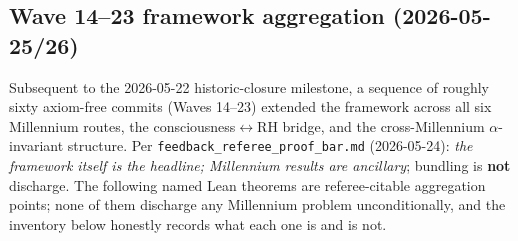 \subsection{Wave 14--23 framework aggregation (2026-05-25/26)}
\label{sec:wave14-23-aggregation}

Subsequent to the 2026-05-22 historic-closure milestone, a sequence of
roughly sixty axiom-free commits (Waves 14--23) extended the framework
across all six Millennium routes, the consciousness$\leftrightarrow$RH
bridge, and the cross-Millennium $\alpha$-invariant structure. Per
\texttt{feedback\_referee\_proof\_bar.md} (2026-05-24): \emph{the
framework itself is the headline; Millennium results are ancillary};
bundling is \textbf{not} discharge. The following named Lean theorems
are referee-citable aggregation points; none of them discharge any
Millennium problem unconditionally, and the inventory below honestly
records what each one is and is not.

